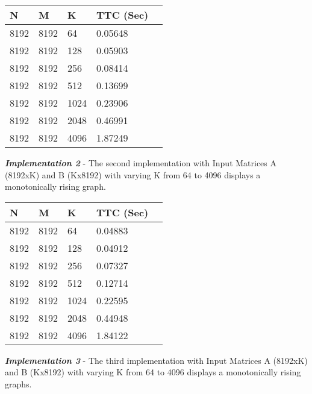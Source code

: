 \documentclass[14pt,fleqn]{article}
\begin{document}
\begin{center}
\begin{tabular}{|l|l|l|l|l|}                                   
    \hline\hline         
    N  & M & K & TTC (Sec) \\
    \hline\hline
    8192 & 8192 & 64 & 0.05648 \\ \hline
    8192 & 8192 & 128 & 0.05903 \\ \hline
    8192 & 8192 & 256 & 0.08414 \\ \hline
    8192 & 8192 & 512 & 0.13699 \\ \hline
    8192 & 8192 & 1024 & 0.23906 \\ \hline
    8192 & 8192 & 2048 & 0.46991 \\ \hline
    8192 & 8192 & 4096 & 1.87249 \\ \hline

\end{tabular}
\end{center}

\textit{\textbf{Implementation 2}} - The second implementation with Input Matrices A (8192xK) and B (Kx8192) with varying K from 64 to 4096 displays a monotonically rising graph.\\

\begin{center}
\begin{tabular}{|l|l|l|l|l|}                                   
    \hline\hline         
    N  & M & K & TTC (Sec) \\
    \hline\hline
    8192 & 8192 & 64 & 0.04883 \\ \hline
    8192 & 8192 & 128 & 0.04912 \\ \hline
    8192 & 8192 & 256 & 0.07327 \\ \hline
    8192 & 8192 & 512 & 0.12714 \\ \hline
    8192 & 8192 & 1024 & 0.22595 \\ \hline
    8192 & 8192 & 2048 & 0.44948 \\ \hline
    8192 & 8192 & 4096 & 1.84122 \\ \hline

\end{tabular}
\end{center}

\textit{\textbf{Implementation 3}} - The third implementation with Input Matrices A (8192xK) and B (Kx8192) with varying K from 64 to 4096 displays a monotonically rising graphs.\\
\end{document}
